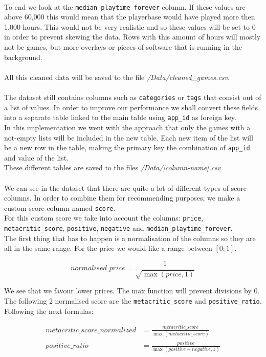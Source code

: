 \documentclass{article}
\begin{document}
	\\
	To end we look at the \texttt{median\_playtime\_forever} column. If these values are above 60,000 this would mean that the playerbase would have played more then 1,000 hours. This would not be very realistic and so these values will be set to 0 in order to prevent skewing the data. Rows with this amount of hours will mostly not be games, but more overlays or pieces of software that is running in the background.\\
	\\
	All this cleaned data will be saved to the file \textit{/Data/cleaned\_games.csv}.\\
	\\
	The dataset still contains columns such as \texttt{categories} or \texttt{tags} that consist out of a list of values. In order to improve our performance we shall convert these fields into a separate table linked to the main table using \texttt{app\_id} as foreign key.\\
	In this implementation we went with the approach that only the games with a not-empty lists will be included in the new table. Each new item of the list will be a new row in the table, making the primary key the combination of \texttt{app\_id} and value of the list.\\
	These different tables are saved to the files \textit{/Data/[column-name].csv}\\
	\\
	We can see in the dataset that there are quite a lot of different types of score columns. In order to combine them for recommending purposes, we make a custom score column named \texttt{score}.\\
	For this custom score we take into account the columns: \texttt{price}, \texttt{metacritic\_score}, \texttt{positive}, \texttt{negative} and \texttt{median\_playtime\_forever}.\\
	The first thing that has to happen is a normalisation of the columns so they are all in the same range. For the price we would like a range between $\left[0;1\right]$.
	
	$$normalised\_price = \frac{1}{\sqrt{\max{\left(price, 1\right)}}}$$
	
	We see that we favour lower prices. The max function will prevent divisions by 0.\\
	The following 2 normalised score are the \texttt{metacritic\_score} and \texttt{positive\_ratio}. Following the next formulas:
	
	\begin{align}
		metacritic\_score\_normalized &= \frac{metacritic\_score}{\max{\left(metacritic\_score\right)}} \\
		positive\_ratio &= \frac{positive}{\max{\left(positive + negative, 1\right)}}
	\end{align}
	
\end{document}
